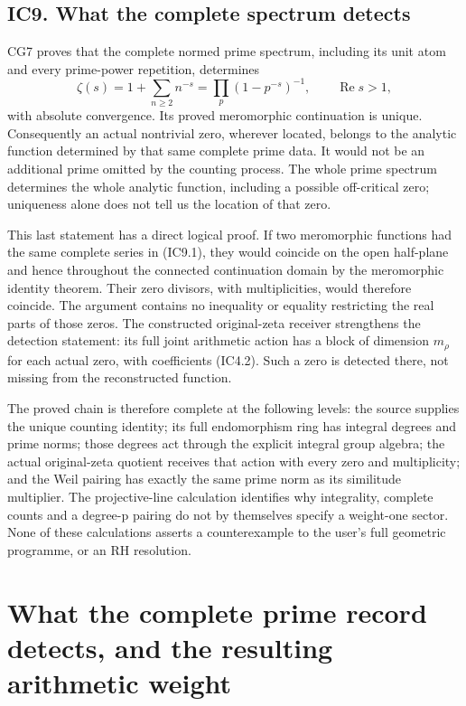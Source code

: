 \documentclass[
]{article}
\begin{document}
\subsection{IC9. What the complete spectrum
detects}\label{ic9.-what-the-complete-spectrum-detects}

CG7 proves that the complete normed prime spectrum, including its unit
atom and every prime-power repetition, determines \[
\zeta(s)=1+\sum_{n\ge2}n^{-s}
=\prod_p(1-p^{-s})^{-1},\qquad\operatorname{Re}s>1,
\tag{IC9.1}
\] with absolute convergence. Its proved meromorphic continuation is
unique. Consequently an actual nontrivial zero, wherever located,
belongs to the analytic function determined by that same complete prime
data. It would not be an additional prime omitted by the counting
process. The whole prime spectrum determines the whole analytic
function, including a possible off-critical zero; uniqueness alone does
not tell us the location of that zero.

This last statement has a direct logical proof. If two meromorphic
functions had the same complete series in (IC9.1), they would coincide
on the open half-plane and hence throughout the connected continuation
domain by the meromorphic identity theorem. Their zero divisors, with
multiplicities, would therefore coincide. The argument contains no
inequality or equality restricting the real parts of those zeros. The
constructed original-zeta receiver strengthens the detection statement:
its full joint arithmetic action has a block of dimension \(m_\rho\) for
each actual zero, with coefficients (IC4.2). Such a zero is detected
there, not missing from the reconstructed function.

The proved chain is therefore complete at the following levels: the
source supplies the unique counting identity; its full endomorphism ring
has integral degrees and prime norms; those degrees act through the
explicit integral group algebra; the actual original-zeta quotient
receives that action with every zero and multiplicity; and the Weil
pairing has exactly the same prime norm as its similitude multiplier.
The projective-line calculation identifies why integrality, complete
counts and a degree-p pairing do not by themselves specify a weight-one
sector. None of these calculations asserts a counterexample to the
user's full geometric programme, or an RH resolution.

\section{What the complete prime record detects, and the resulting
arithmetic
weight}\label{what-the-complete-prime-record-detects-and-the-resulting-arithmetic-weight}
\end{document}
